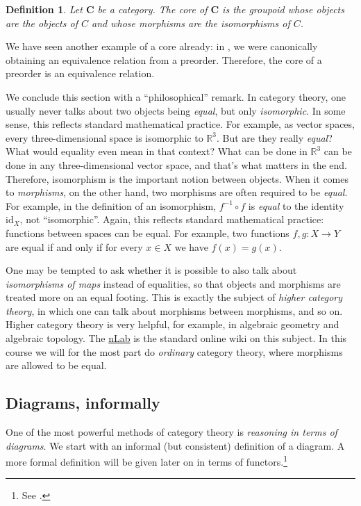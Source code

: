 \documentclass[12pt,oneside]{scrbook}
\numberwithin{equation}{section}
\theoremstyle{plain}
\newtheorem{deph}[thm]{Definition}
\theoremstyle{definition}
\newcommand{\R}{\mathbb{R}}
\newcommand{\cat}[1]{{\mathbf{#1}}} %
\DeclareMathOperator{\1}{\mathbbm{1}}
\DeclareMathOperator{\2}{\mathbbm{2}}
\newcommand{\id}{\mathrm{id}} %
\begin{document}
\begin{deph}\label{core}
 Let $\cat{C}$ be a category. The \emph{core} of $\cat{C}$ is the groupoid whose objects are the objects of $C$ and whose morphisms are the isomorphisms of $C$. 
\end{deph}

We have seen another example of a core already: in , we were canonically obtaining an equivalence relation from a preorder. Therefore, the core of a preorder is an equivalence relation.

We conclude this section with a ``philosophical'' remark. In category theory, one usually never talks about two objects being \emph{equal}, but only \emph{isomorphic}. In some sense, this reflects standard mathematical practice. For example, as vector spaces, every three-dimensional space is isomorphic to $\R^3$. But are they really \emph{equal}? What would equality even mean in that context? What can be done in $\R^3$ can be done in any three-dimensional vector space, and that's what matters in the end. Therefore, isomorphism is the important notion between objects. 
When it comes to \emph{morphisms}, on the other hand, two morphisms are often required to be \emph{equal}. For example, in the definition of an isomorphism, $f^{-1}\circ f$ is \emph{equal} to the identity $\id_X$, not ``isomorphic''.
Again, this reflects standard mathematical practice: functions between spaces can be equal. For example, two functions $f,g:X\to Y$ are equal if and only if for every $x\in X$ we have $f(x)=g(x)$. 

One may be tempted to ask whether it is possible to also talk about \emph{isomorphisms of maps} instead of equalities, so that objects and morphisms are treated more on an equal footing. This is exactly the subject of \emph{higher category theory}, in which one can talk about morphisms between morphisms, and so on. Higher category theory is very helpful, for example, in algebraic geometry and algebraic topology. The \href{http://ncatlab.org}{nLab} is the standard online wiki on this subject. 
In this course we will for the most part do \emph{ordinary} category theory, where morphisms are allowed to be equal. 


\subsection{Diagrams, informally}\label{infdiagrams}

One of the most powerful methods of category theory is \emph{reasoning in terms of diagrams}. 
We start with an informal (but consistent) definition of a diagram. A more formal definition will be given later on in terms of functors.\footnote{See .}
\end{document}
